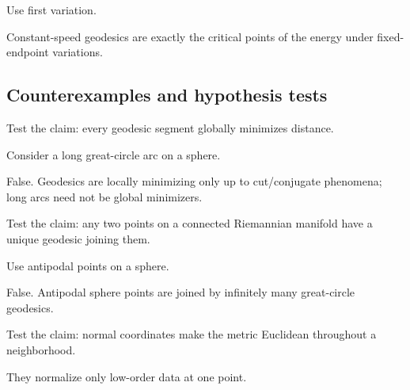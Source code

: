 \begin{hint}
Use first variation.
\end{hint}

\begin{solution}
Constant-speed geodesics are exactly the critical points of the energy under fixed-endpoint variations.
\end{solution}

\subsection*{Counterexamples and hypothesis tests}

\begin{exercise}\label{exr:vii23-ped-10}
Test the claim: every geodesic segment globally minimizes distance.
\end{exercise}

\begin{hint}
Consider a long great-circle arc on a sphere.
\end{hint}

\begin{solution}
False.  Geodesics are locally minimizing only up to cut/conjugate phenomena; long arcs need not be global minimizers.
\end{solution}

\begin{exercise}\label{exr:vii23-ped-11}
Test the claim: any two points on a connected Riemannian manifold have a unique geodesic joining them.
\end{exercise}

\begin{hint}
Use antipodal points on a sphere.
\end{hint}

\begin{solution}
False.  Antipodal sphere points are joined by infinitely many great-circle geodesics.
\end{solution}

\begin{exercise}\label{exr:vii23-ped-12}
Test the claim: normal coordinates make the metric Euclidean throughout a neighborhood.
\end{exercise}

\begin{hint}
They normalize only low-order data at one point.
\end{hint}

